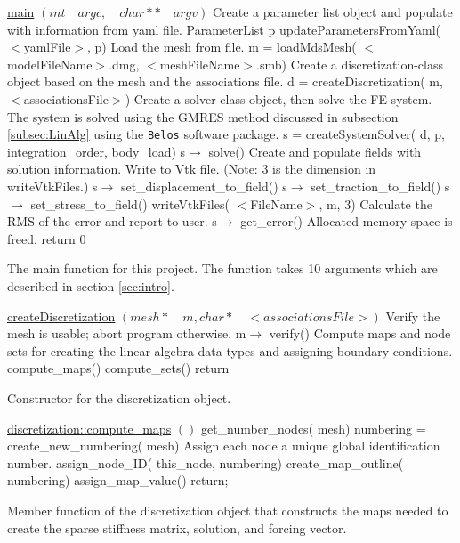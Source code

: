 \documentclass[a4paper, 12pt]{article}
\begin{document}
\vspace{\baselineskip}
\begin{algorithm} [H]
  \underline{main} $(int \quad argc, \quad char** \quad argv)$
  \BlankLine
    \tcc
    {
      Create a parameter list object and populate with information
      from yaml file.  }
    ParameterList p\;
    updateParametersFromYaml( $<$yamlFile$>$, p)\;
    \tcc
    {
      Load the mesh from file.
    }
    m = loadMdsMesh( $<$modelFileName$>$.dmg, $<$meshFileName$>$.smb)\;
    \tcc
    {
      Create a discretization-class object based on the mesh
      and the associations file.
    }
    d = createDiscretization( m, $<$associationsFile$>$)\;
    \tcc
    {
      Create a solver-class object, then solve the FE system.
      The system is solved using the GMRES method discussed
      in subsection \ref{subsec:LinAlg} using the
      \texttt{Belos} software package.
    }
    s = createSystemSolver( d, p, integration\_order, body\_load)\;
    s$\rightarrow$ solve()\;
    \tcc
    {
      Create and populate fields with solution information.
      Write to Vtk file. (Note: 3 is the dimension in writeVtkFiles.)
    }
    s$\rightarrow$ set\_displacement\_to\_field()\;
    s$\rightarrow$ set\_traction\_to\_field()\;
    s$\rightarrow$ set\_stress\_to\_field()\;
    writeVtkFiles( $<$FileName$>$, m, 3)\;
    \tcc
    {
      Calculate the RMS of the error and report to user.
    }
    s$\rightarrow$ get\_error()\;
    \tcc
    {
      Allocated memory space is freed.
    }
    return 0 \;
  \caption{The main function for this project. The function takes 10
            arguments which are described in section \ref{sec:intro}.}
  \label{al:main}
\end{algorithm}

\vspace{\baselineskip}
\begin{algorithm}[H]
  \underline{createDiscretization} $(mesh* \quad m, char* \quad <associationsFile>)$
  \BlankLine
  \tcc
  {
    Verify the mesh is usable; abort program otherwise.
  }
  m$\rightarrow$ verify()\;
  \tcc
  {
    Compute maps and node sets for creating the linear algebra data types
    and assigning boundary conditions.
  }
  compute\_maps()\;
  compute\_sets()\;
  return\;
  \caption{Constructor for the discretization object.}
  \label{al:creatDisc}
\end{algorithm}

\vspace{\baselineskip}
\begin{algorithm}
  \underline{discretization::compute\_maps} $()$
  \BlankLine
  get\_number\_nodes( mesh)\;
  numbering = create\_new\_numbering( mesh)\;
  {
    \tcc
    {
      Assign each node a unique global identification number.
    }
    assign\_node\_ID( this\_node, numbering)\;
  }
  create\_map\_outline( numbering)\;
  {
    {
      assign\_map\_value()\;
    }
  }
  return;
  \caption{Member function of the discretization object that constructs
            the maps needed to create the sparse stiffness matrix, solution,
            and forcing vector.}
  \label{al:compMaps}
\end{algorithm}
\end{document}
